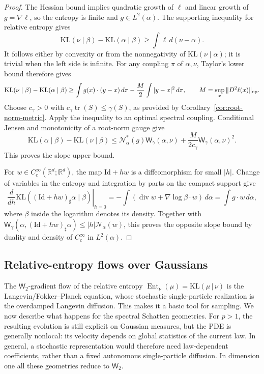 \documentclass{article}
\newcommand{\R}{\mathbb{R}}
\newcommand{\MN}{\mathcal{N}}
\newcommand{\Wtwo}{\mathsf{W}_2}
\newcommand{\Wg}{\mathsf{W}_{\gamma}}
\newcommand{\tr}{\operatorname{tr}}
\newcommand{\divv}{\operatorname{div}}
\newcommand{\Id}{\mathrm{Id}}
\newcommand{\KL}{\mathrm{KL}}
\begin{document}
\begin{proof}
The Hessian bound implies quadratic growth of $\ell$ and linear growth of
$g=\nabla\ell$, so the entropy is finite and $g\in L^2(\alpha)$.
The supporting inequality for relative entropy gives
\[
 \KL(\nu\mid\beta)-\KL(\alpha\mid\beta)
 \ge\int\ell\,d(\nu-\alpha).
\]
It follows either by convexity or from the nonnegativity of
$\KL(\nu\mid\alpha)$; it is trivial when the left side is infinite.
For any coupling $\pi$ of $\alpha,\nu$, Taylor's lower bound therefore gives
\[
 \KL(\nu\mid\beta)-\KL(\alpha\mid\beta)
 \ge\int g(x)\cdot(y-x)\,d\pi
       -\frac M2\int|y-x|^2\,d\pi,
 \qquad M=\sup_x\|D^2\ell(x)\|_{\rm op}.
\]
Choose $c_\gamma>0$ with $c_\gamma\tr(S)\le\gamma(S)$, as provided by
Corollary~\ref{cor:root-norm-metric}. Apply the inequality to an optimal
spectral coupling. Conditional Jensen and monotonicity of a root-norm gauge give
\[
 \KL(\alpha\mid\beta)-\KL(\nu\mid\beta)
 \le\MN_\alpha^*(g)\Wg(\alpha,\nu)
       +\frac{M}{2c_\gamma}\Wg(\alpha,\nu)^2.
\]
This proves the slope upper bound.

For $w\in C_c^\infty(\R^d;\R^d)$, the map $\Id+hw$ is a diffeomorphism
for small $|h|$. Change of variables in the entropy and integration by parts
on the compact support give
\[
 \left.\frac{d}{dh}\KL((\Id+hw)_\sharp\alpha\mid\beta)\right|_{h=0}
 =-\int(\divv w+\nabla\log\beta\cdot w)\,d\alpha
 =\int g\cdot w\,d\alpha,
\]
where $\beta$ inside the logarithm denotes its density. Together with
$\Wg(\alpha,(\Id+hw)_\sharp\alpha)\le |h|\MN_\alpha(w)$, this proves the
opposite slope bound by duality and density of $C_c^\infty$ in $L^2(\alpha)$.
\end{proof}

\subsection{Relative-entropy flows over Gaussians}
\label{sec:relative-entropy-gaussians}

The $\Wtwo$-gradient flow of the relative entropy
$\operatorname{Ent}_\nu(\mu) = \KL(\mu\,|\,\nu)$ is the Langevin/Fokker--Planck equation, whose stochastic
single-particle realization is the overdamped Langevin diffusion. This makes
it a basic tool for sampling. We now describe what happens for the spectral
Schatten geometries. For $p>1$, the resulting evolution is still explicit on
Gaussian measures, but the PDE is generally nonlocal: its velocity depends
on global statistics of the current law. In general, a stochastic
representation would therefore need law-dependent coefficients, rather than
a fixed autonomous single-particle diffusion. In dimension one all these
geometries reduce to $\Wtwo$.
\end{document}
